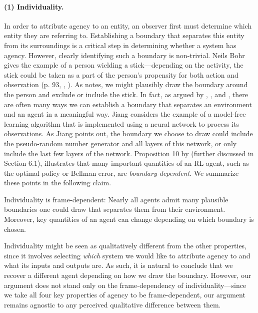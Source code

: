 \documentclass[11pt]{article} %
\begin{document}
%
\paragraph{(1) Individuality.} In order to attribute agency to an entity, an observer first must determine which entity they are referring to. Establishing a boundary that separates this entity from its surroundings is a critical step in determining whether a system has agency. However, clearly identifying such a boundary is non-trivial. 
%
Neils Bohr gives the example of a person wielding a stick---depending on the activity, the stick could be taken as a part of the person's propensity for both action and observation (p. 93, \citeauthor{klein1967glimpses}, \citeyear{klein1967glimpses}). As \cite{harutyunyan2020what} notes, we might plausibly draw the boundary around the person and exclude or include the stick. 
%
In fact, as argued by \cite{clark1998extended}, \cite{jiang2019value}, and \cite{harutyunyan2020what}, there are often many ways we can establish a boundary that separates an environment and an agent in a meaningful way. Jiang considers the example of a model-free learning algorithm that is implemented using a neural network to process its observations. As Jiang points out, the boundary we choose to draw could include the pseudo-random number generator and all layers of this network, or only include the last few layers of the network. Proposition 10 by \cite{jiang2019value} (further discussed in Section 6.1), illustrates that many important quantities of an RL agent, such as the optimal policy or Bellman error, are \textit{boundary-dependent}. We summarize these points in the following claim.


%
\begin{claim}
Individuality is frame-dependent: Nearly all agents admit many plausible boundaries one could draw that separates them from their environment. Moreover, key quantities of an agent can change depending on which boundary is chosen. 
\end{claim}


%
Individuality might be seen as qualitatively different from the other properties, since it involves selecting \textit{which} system we would like to attribute agency to and what its inputs and outputs are. As such, it is natural to conclude that we recover a different agent depending on how we draw the boundary. However, our argument does not stand only on the frame-dependency of individuality---since we take all four key properties of agency to be frame-dependent, our argument remains agnostic to any perceived qualitative difference between them. 
%
%
\end{document}
